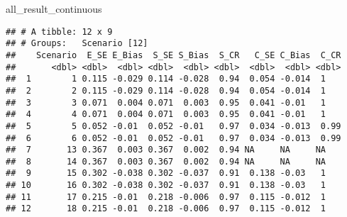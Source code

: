 \documentclass[
]{article}
\newenvironment{Shaded}{\begin{snugshade}}{\end{snugshade}}
\newcommand{\NormalTok}[1]{#1}
\begin{document}
\begin{Shaded}
\begin{Highlighting}[]
\NormalTok{all\_result\_continuous}
\end{Highlighting}
\end{Shaded}

\begin{verbatim}
## # A tibble: 12 x 9
## # Groups:   Scenario [12]
##    Scenario  E_SE E_Bias  S_SE S_Bias  S_CR   C_SE C_Bias  C_CR
##       <dbl> <dbl>  <dbl> <dbl>  <dbl> <dbl>  <dbl>  <dbl> <dbl>
##  1        1 0.115 -0.029 0.114 -0.028  0.94  0.054 -0.014  1   
##  2        2 0.115 -0.029 0.114 -0.028  0.94  0.054 -0.014  1   
##  3        3 0.071  0.004 0.071  0.003  0.95  0.041 -0.01   1   
##  4        4 0.071  0.004 0.071  0.003  0.95  0.041 -0.01   1   
##  5        5 0.052 -0.01  0.052 -0.01   0.97  0.034 -0.013  0.99
##  6        6 0.052 -0.01  0.052 -0.01   0.97  0.034 -0.013  0.99
##  7       13 0.367  0.003 0.367  0.002  0.94 NA     NA     NA   
##  8       14 0.367  0.003 0.367  0.002  0.94 NA     NA     NA   
##  9       15 0.302 -0.038 0.302 -0.037  0.91  0.138 -0.03   1   
## 10       16 0.302 -0.038 0.302 -0.037  0.91  0.138 -0.03   1   
## 11       17 0.215 -0.01  0.218 -0.006  0.97  0.115 -0.012  1   
## 12       18 0.215 -0.01  0.218 -0.006  0.97  0.115 -0.012  1
\end{verbatim}
\end{document}
